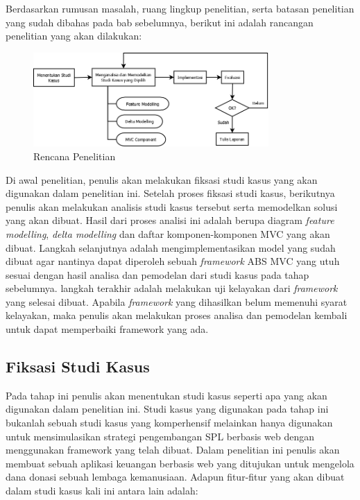 \chapter{\babEmpat}

Berdasarkan rumusan masalah, ruang lingkup penelitian, serta batasan penelitian yang sudah dibahas pada bab sebelumnya, berikut ini adalah rancangan penelitian yang akan dilakukan:

\begin{figure}
    \centering
    \includegraphics[width=0.8\textwidth]
        {img/alur-penelitian.png}
    \caption{Rencana Penelitian}
\end{figure}

\noindent
Di awal penelitian, penulis akan melakukan fiksasi studi kasus yang akan digunakan dalam penelitian ini. Setelah proses fiksasi studi kasus, berikutnya penulis akan melakukan analisis studi kasus tersebut serta memodelkan solusi yang akan dibuat. Hasil dari proses analisi ini adalah berupa diagram \textit{feature modelling}, \textit{delta modelling} dan daftar komponen-komponen MVC yang akan dibuat. Langkah selanjutnya adalah mengimplementasikan model yang sudah dibuat agar nantinya dapat diperoleh sebuah \textit{framework} ABS MVC yang utuh sesuai dengan hasil analisa dan pemodelan dari studi kasus pada tahap sebelumnya. langkah terakhir adalah melakukan uji kelayakan dari \textit{framework} yang selesai dibuat. Apabila \textit{framework} yang dihasilkan belum memenuhi syarat kelayakan, maka penulis akan melakukan proses analisa dan pemodelan kembali untuk dapat memperbaiki framework yang ada.

\section{Fiksasi Studi Kasus}
Pada tahap ini penulis akan menentukan studi kasus seperti apa yang akan digunakan dalam penelitian ini. Studi kasus yang digunakan pada tahap ini bukanlah sebuah studi kasus yang komperhensif melainkan hanya digunakan untuk mensimulasikan strategi pengembangan SPL berbasis web dengan menggunakan framework yang telah dibuat. Dalam penelitian ini penulis akan membuat sebuah aplikasi keuangan berbasis web yang ditujukan untuk mengelola dana donasi sebuah lembaga kemanusiaan. Adapun fitur-fitur yang akan dibuat dalam studi kasus kali ini antara lain adalah:

